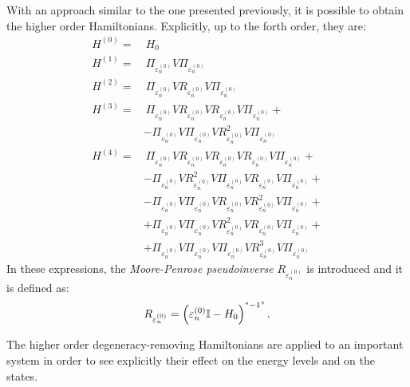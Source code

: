 With an approach similar to the one presented previously, it is possible to obtain the higher order Hamiltonians. Explicitly, up to the forth order, they are:
\begin{align}
    H^{(0)} =&~ H_0 \label{eq:H0} \\
    H^{(1)} =&~ \Pi_{\varepsilon^{(0)}_n} V \Pi_{\varepsilon^{(0)}_n} \label{eq:H1}\\
    H^{(2)} =&~\Pi_{\varepsilon^{(0)}_n} V R_{\varepsilon^{(0)}_n} V \Pi_{\varepsilon^{(0)}_n}  \label{eq:H2} \\
    H^{(3)} =&~ \Pi_{\varepsilon^{(0)}_n} V R_{\varepsilon^{(0)}_n} V R_{\varepsilon^{(0)}_n} V \Pi_{\varepsilon^{(0)}_n} + \nonumber \\
    &- \Pi_{\varepsilon^{(0)}_n} V \Pi_{\varepsilon^{(0)}_n} V R_{\varepsilon^{(0)}_n}^2 V \Pi_{\varepsilon^{(0)}_n} \label{eq:H3} \\
    H^{(4)} =&~ \Pi_{\varepsilon^{(0)}_n} V R_{\varepsilon^{(0)}_n} V R_{\varepsilon^{(0)}_n} V R_{\varepsilon^{(0)}_n} V \Pi_{\varepsilon^{(0)}_n} + \nonumber \\
    & -\Pi_{\varepsilon^{(0)}_n} V R_{\varepsilon^{(0)}_n}^2 V \Pi_{\varepsilon^{(0)}_n} V R_{\varepsilon^{(0)}_n} V \Pi_{\varepsilon^{(0)}_n} + \nonumber \\
    &- \Pi_{\varepsilon^{(0)}_n} V \Pi_{\varepsilon^{(0)}_n} V R_{\varepsilon^{(0)}_n} V R_{\varepsilon^{(0)}_n}^2 V \Pi_{\varepsilon^{(0)}_n} + \nonumber \\
    &+ \Pi_{\varepsilon^{(0)}_n} V \Pi_{\varepsilon^{(0)}_n} V R_{\varepsilon^{(0)}_n}^2 V R_{\varepsilon^{(0)}_n} V \Pi_{\varepsilon^{(0)}_n} + \nonumber \\
    &+ \Pi_{\varepsilon^{(0)}_n} V \Pi_{\varepsilon^{(0)}_n} V \Pi_{\varepsilon^{(0)}_n} V R_{\varepsilon^{(0)}_n}^3 V \Pi_{\varepsilon^{(0)}_n} \label{eq:H4}
\end{align}
In these expressions, the \textit{Moore-Penrose pseudoinverse} $R_{\varepsilon^{(0)}_n}$ is introduced and it is defined as:
\begin{equation}
    R_{\varepsilon^{(0)}_n} = \left(\varepsilon^{(0)}_n \mathbb{I} - H_0 \right)^{``-1"}.
\end{equation}

The higher order degeneracy-removing Hamiltonians are applied to an important system in order to see explicitly their effect on the energy levels and on the states. 

